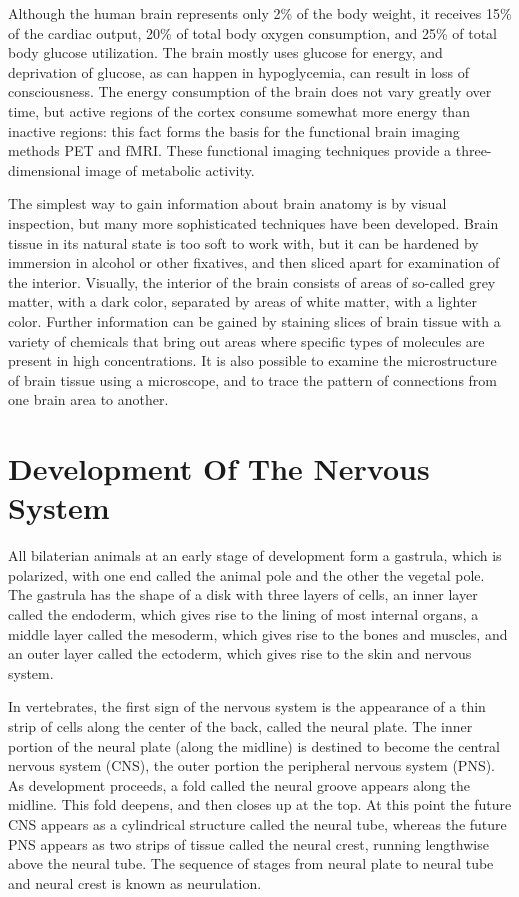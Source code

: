 \documentclass[]{book}
\begin{document}
Although the human brain represents only 2\% of the body weight, it receives 15\% of the cardiac output, 20\% of total body oxygen consumption, and 25\% of total body glucose utilization. The brain mostly uses glucose for energy, and deprivation of glucose, as can happen in hypoglycemia, can result in loss of consciousness. The energy consumption of the brain does not vary greatly over time, but active regions of the cortex consume somewhat more energy than inactive regions: this fact forms the basis for the functional brain imaging methods PET and fMRI. These functional imaging techniques provide a three-dimensional image of metabolic activity.

The simplest way to gain information about brain anatomy is by visual inspection, but many more sophisticated techniques have been developed. Brain tissue in its natural state is too soft to work with, but it can be hardened by immersion in alcohol or other fixatives, and then sliced apart for examination of the interior. Visually, the interior of the brain consists of areas of so-called grey matter, with a dark color, separated by areas of white matter, with a lighter color. Further information can be gained by staining slices of brain tissue with a variety of chemicals that bring out areas where specific types of molecules are present in high concentrations. It is also possible to examine the microstructure of brain tissue using a microscope, and to trace the pattern of connections from one brain area to another.

\hypertarget{development-of-the-nervous-system}{%
\section{Development Of The Nervous System}\label{development-of-the-nervous-system}}

All bilaterian animals at an early stage of development form a gastrula, which is polarized, with one end called the animal pole and the other the vegetal pole. The gastrula has the shape of a disk with three layers of cells, an inner layer called the endoderm, which gives rise to the lining of most internal organs, a middle layer called the mesoderm, which gives rise to the bones and muscles, and an outer layer called the ectoderm, which gives rise to the skin and nervous system.

In vertebrates, the first sign of the nervous system is the appearance of a thin strip of cells along the center of the back, called the neural plate. The inner portion of the neural plate (along the midline) is destined to become the central nervous system (CNS), the outer portion the peripheral nervous system (PNS). As development proceeds, a fold called the neural groove appears along the midline. This fold deepens, and then closes up at the top. At this point the future CNS appears as a cylindrical structure called the neural tube, whereas the future PNS appears as two strips of tissue called the neural crest, running lengthwise above the neural tube. The sequence of stages from neural plate to neural tube and neural crest is known as neurulation.
\end{document}
